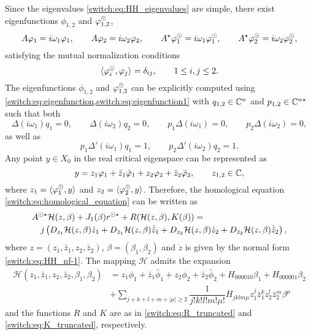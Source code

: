 \medskip
\par
Since the eigenvalues \cref{switch:eq:HH_eigenvalues} are simple, there exist eigenfunctions $\phi_{1,2}$ and $\varphi_{1,2}^{\odot}$,
\begin{equation}
A\varphi_{1}=i\omega_{1}\varphi_{1},\qquad A\varphi_{2}=i\omega_{2}\varphi_{2},\qquad A^{\star}\varphi_1^{\odot}=i\omega_1\varphi_1^{\odot},\qquad A^{\star}\varphi_2^{\odot}=i\omega_2\varphi_2^{\odot},\label{switch:eq:HH_eigenfunctions}
\end{equation}
satisfying the mutual normalization conditions
\[
\langle \varphi_i^{\odot},\varphi_j \rangle_{} = \delta_{ij}, \qquad 1 \leq i,j \leq 2.
\]
The eigenfunctions $\phi_{1,2}$ and $\varphi_{1,2}^{\odot}$ can be explicitly computed using \cref{switch:eq:eigenfunction,switch:eq:eigenfunction1} with $q_{1,2} \in \mathbb{C}^n$ and $p_{1,2} \in \mathbb{C}^{n\star}$ such that both
\[
\Delta(i\omega_{1})q_{1}=0,\qquad\Delta(i\omega_{2})q_{2}=0,\qquad p_{1}\Delta(i\omega_{1})=0,\qquad p_{2}\Delta(i\omega_{2})=0,
\]
as well as
\[
  p_1\Delta'(i\omega_1)q_1 = 1, \qquad p_2\Delta'(i\omega_2)q_2 = 1.
\]
Any point $y\in X_{0}$ in the real critical eigenspace can be represented as
\[
y=z_{1}\varphi_{1}+\bar{z}_{1}\bar{\varphi}_{1}+z_{2}\varphi_{2}+\bar{z}_{2}\bar{\varphi}_{2},\qquad z_{1,2}\in \mathbb{C},
\]
where $z_1=\langle \varphi_1^{\odot},y \rangle_{}$ and $z_2=\langle \varphi_2^{\odot},y \rangle_{}$. Therefore, the homological equation \cref{switch:eq:homological_equation} can be written as
\begin{equation}
  \label{switch:eq:HH_homological_eq}
  \begin{multlined}
    \SUNSTAR{A}\mathcal{H}(z,\beta)+J_{1}(\beta) \rss +R(\mathcal{H}(z,\beta),K(\beta)) =\\
    j\left(D_{z_{1}}\mathcal{H}(z,\beta)\dot{z}_{1}+D_{\bar{z}_{1}}\mathcal{H}(z,\beta)\dot{\bar{z}}_{1}+D_{z_{2}}\mathcal{H}(z,\beta)\dot{z}_{2}+D_{\bar{z}_{2}}\mathcal{H}(z,\beta)\dot{\bar{z}}_{2}\right),
  \end{multlined}
\end{equation}
where $z=(z_{1},\bar{z}_{1},z_{2},\bar{z}_{2})$, $\beta=(\beta_1,\beta_2)$ and $\dot{z}$ is given by the normal form \cref{switch:eq:HH_nf-1}. The mapping $\mathcal{H}$ admits the expansion
\begin{equation}
  \label{switch:eq:H_expansion-1-2}
  \begin{aligned}
    \mathcal{H}(z_{1},\bar{z}_{1},z_{2},\bar{z}_{2},\beta_{1},\beta_{2})&= z_{1}\phi_{1}+\bar{z}_{1}\bar{\phi}_{1}+z_{2}\phi_{2}+\bar{z}_{2}\bar{\phi}_{2}+H_{000010}\beta_1 + H_{000001}\beta_2\\
    &+ \sum_{j+k+l+m+|\mu| \geq 2}\dfrac{1}{j!k!l!m!\mu!}H_{jklm\mu}z_{1}^{j}\bar{z}_{1}^{k}z_{2}^{l}\bar{z}_{2}^{m}\beta^{\mu}
  \end{aligned}
\end{equation}
and the functions $R$ and $K$ are as in \cref{switch:eq:R_truncated} and \cref{switch:eq:K_truncated}, respectively.

